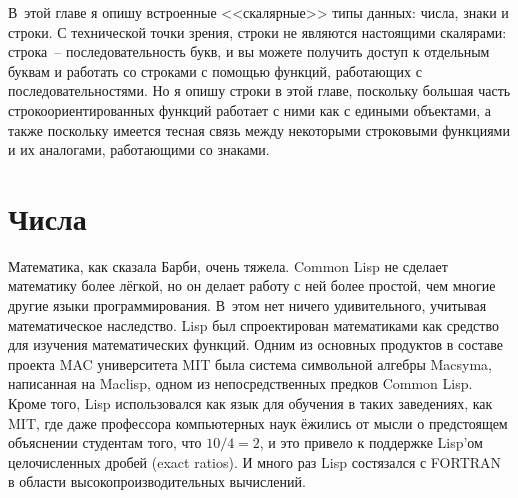 В~этой главе я опишу встроенные <<скалярные>> типы данных: числа, знаки и строки.  С
технической точки зрения, строки не являются настоящими скалярами: строка~--
последовательность букв, и вы можете получить доступ к отдельным буквам и работать со
строками с помощью функций, работающих с последовательностями.  Но я опишу строки в этой
главе, поскольку большая часть строкоориентированных функций работает с ними как с
едиными объектами, а также поскольку имеется тесная связь между некоторыми строковыми
функциями и их аналогами, работающими со знаками.

\section{Числа}

Математика, как сказала Барби, очень тяжела.
Common Lisp не сделает математику более лёгкой, но он делает работу с ней более простой,
чем многие другие языки программирования.  В~этом нет ничего удивительного, учитывая
математическое наследство.  Lisp был спроектирован математиками как средство для изучения
математических функций.  Одним из основных продуктов в составе проекта MAC университета
MIT была система символьной алгебры Macsyma, написанная на Maclisp, одном из
непосредственных предков Common Lisp.  Кроме того, Lisp использовался как язык для
обучения в таких заведениях, как MIT, где даже профессора компьютерных наук ёжились от
мысли о предстоящем объяснении студентам того, что $10/4 = 2$, и это привело к поддержке
Lisp'ом целочисленных дробей (exact ratios).  И много раз Lisp состязался с FORTRAN в
области высокопроизводительных вычислений.

